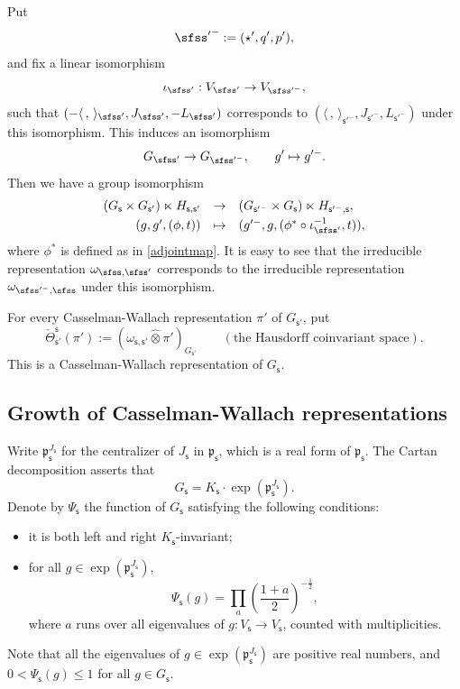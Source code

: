 \documentclass[11pt,a4paper]{amsart}
\newcommand{\p}{\mathfrak p}
\newcommand{\la}{\langle}
\newcommand{\ra}{\rangle}
\newcommand{\be}{\begin {equation}}
\newcommand{\ee}{\end {equation}}
\numberwithin{equation}{section}
\theoremstyle{remark}
\begin{document}
Put
\[
   {\sfss'}^-:=(\star', q', p'),
\]
and fix a linear isomorphism
\be\label{iota0}
 \iota_{\sfss'}:  V_{\sfss'}\rightarrow V_{\sfss'^-}, 
\ee
such that $(-\la\,,\,\ra_{\sfss'}, J_{\sfss'},-L_{\sfss'})$ corresponds to   $(\la\,,\,\ra_{\mathsf s'^-}, J_{\mathsf s'^-}, L_{\mathsf s'^-})$ under this isomorphism.
This induces an isomorphism
\be\label{isoggp}
  G_{\sfss'}\rightarrow G_{\sfss'^-}, \qquad g'\mapsto g'^-.
\ee
Then we have a group isomorphism
\be\label{identifyjg}
\begin{array}{rcl}
  (G_{\mathsf s}\times G_{\mathsf s'})\ltimes H_{\mathsf s, \mathsf s'}&\rightarrow& (G_{\mathsf s'^-}\times G_{\mathsf s})\ltimes H_{\mathsf s'^-, \mathsf s},\smallskip\\
   (g, g', (\phi, t))&\mapsto & (g'^-, g, (\phi^*  \circ \iota_{\sfss'}^{-1}, t)),
   \end{array}
\ee
where $\phi^*$ is defined as in \eqref{adjointmap}. 
It is easy to see that the irreducible representation $\omega_{\sfss, \sfss'}$
corresponds to the irreducible representation $\omega_{\sfss'^-, \sfss}$ under this isomorphism.
    

 For every Casselman-Wallach representation $\pi'$ of $G_{\mathsf s'}$,
put
\[
   \check \Theta_{\mathsf s'}^{\mathsf s}(\pi'):=(\omega_{\mathsf s, \mathsf s'}\widehat \otimes \pi')_{G_{\mathsf s'}} \qquad (\textrm{the  Hausdorff coinvariant space}).
\]
This is a Casselman-Wallach representation of $G_{\mathsf s}$.



\subsection{Growth of Casselman-Wallach representations}

Write $\p_\mathsf s^{J_\mathsf s}$ for the centralizer of $J_\mathsf s$ in $\p_\mathsf s$, which is a real form of $\p_\mathsf s$. The Cartan decomposition asserts that
\[
  G_\mathsf s=K_\mathsf s\cdot \exp(\p_\mathsf s^{J_\mathsf s}).
\]
Denote by  $\Psi_\mathsf s$ the function of $G_\mathsf s$ satisfying the following conditions:
\begin{itemize}
\item it is both left and right $K_\mathsf s$-invariant;
\item for all $g\in \exp(\p_\mathsf s^{J_\mathsf s})$,
\[
  \Psi_\mathsf s(g)=\prod_{a} \left(\frac{1+a}{2}\right)^{-\frac{1}{2}},
\]
 where $a$ runs over all eigenvalues of $g: V_\mathsf s\rightarrow V_\mathsf s$, counted with multiplicities.
\end{itemize}
Note that all the  eigenvalues of $g \in \exp(\p_\mathsf s^{J_\mathsf s})$ are positive real numbers, and  $0<\Psi_\mathsf s(g)\leq 1$ for all $g\in G_\mathsf s$. 
\end{document}
